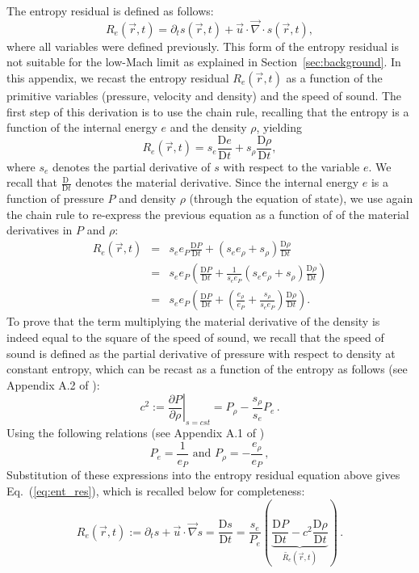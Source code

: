 \documentclass[preprint,10pt]{elsarticle}
\renewcommand{\div}{\vec{\nabla}\! \cdot \!}
\newcommand{\grad}{\vec{\nabla}}
\newcommand{\resi}{R_e}
\newcommand{\resinew}{\widetilde{\resi}}
\newcommand{\matder}[1]{\frac{\textrm{D} #1}{\textrm{D} t}}
\newcommand{\eqt}[1]{Eq.~(\ref{#1})}                     %
\newcommand{\sct}[1]{Section~\ref{#1}}                   %
\begin{document}
The entropy residual is defined as follows:
%
\begin{equation*}
\resi(\vec{r},t) = \partial_t s (\vec{r},t) + \vec{u} \cdot \div s (\vec{r},t) ,
\end{equation*}
%
where all variables were defined previously. This form of the entropy residual is not suitable for the low-Mach limit as explained in \sct{sec:background}. In this appendix, we recast the entropy residual $\resi(\vec{r},t)$ as a function of the primitive variables (pressure, velocity and density) and the speed of sound. The first step of this derivation is to use the chain rule, recalling that the entropy is a function of the internal energy $e$ and the density $\rho$, yielding
%
\begin{equation*}
\resi(\vec{r},t) = s_e  \matder{e} + s_{\rho}  \matder{\rho} ,
\end{equation*}
%
where $s_e$ denotes the partial derivative of $s$ with respect to the variable $e$. We recall that $\matder{\ }$ denotes the material derivative. Since the internal energy $e$ is a function of pressure $P$ and density $\rho$ (through the equation of state), we use again the chain rule to re-express the previous equation as a function of of the material derivatives in $P$ and $\rho$:
%
\begin{eqnarray*}
\resi(\vec{r},t) &=&  s_e e_P \matder{P} + ( s_e e_{\rho} + s_{\rho} ) \matder{\rho} \\
&=& s_e e_P \left( \matder{P} + \frac{1}{s_e e_P} ( s_e e_{\rho} + s_{\rho} )  \matder{\rho}\right) \\
&=& s_e e_P \left( \matder{P} + ( \frac{e_{\rho}}{e_P} + \frac{s_{\rho}}{s_e e_P} )  \matder{\rho} \right) .
\end{eqnarray*}
%
To prove that the term multiplying the material derivative of the density is indeed equal to the square of the speed of sound, we recall that the speed of sound is defined as the partial derivative of pressure with respect to density at constant entropy, which can be recast as a function of the entropy as follows (see Appendix A.2 of \cite{jlg}):
%
\begin{equation*}
c^2 := \left. \frac{\partial P}{\partial \rho} \right|_{s=cst} = P_{\rho} - \frac{s_{\rho}}{s_e} P_e   \, .
\end{equation*}
%
Using the following relations (see Appendix A.1 of \cite{jlg})
%
\begin{equation*}
P_e = \frac{1}{e_P} \text{ and } P_{\rho} = -\frac{e_{\rho}}{e_P}  \, ,
\end{equation*}
%
Substitution of these expressions into the entropy residual equation above gives \eqt{eq:ent_res}, which is recalled below for completeness:
%
\begin{equation*}
\resi(\vec{r},t) := \partial_t s + \vec{u} \cdot \grad s = \matder{s} = \frac{s_e}{P_e} \left( \underbrace{\matder{P} - c^2 \matder{\rho} }_{\resinew(\vec{r},t)} \right) \, .
\end{equation*} 
\end{document}
